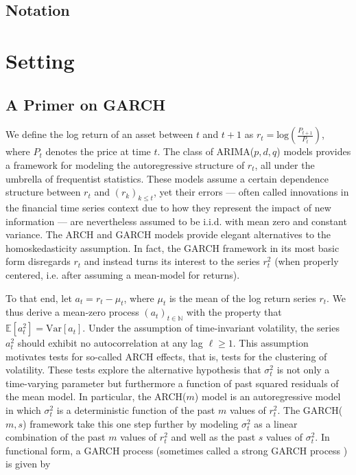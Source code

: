 \documentclass[11pt,3p,review,authoryear]{elsarticle}
\def\mrm#1{\mathrm{#1}} %
\def\E{\mathbb{E}} %
\theoremstyle{definition}
\begin{document}
\subsection{Notation}

\section{Setting}
\label{section2}

\subsection{A Primer on GARCH}
We define the log return of an asset between $t$ and $t+1$ as $r_{t} = \text{log}(\frac{P_{t+1}}{P_{t}})$, where $P_{t}$ denotes the price at time $t$.  The class of ARIMA($p,d,q$) models  \citep{box2013box} provides a framework for modeling the autoregressive structure of $r_{t}$, all under the umbrella of frequentist statistics.  These models assume a certain dependence structure between $r_{t}$ and $(r_{k})_{k\leq t}$, yet their errors --- often called innovations in the financial time series context due to how they represent the impact of new information --- are nevertheless assumed to be i.i.d. with mean zero and constant variance.  The ARCH \citep{engle1982autoregressive} and GARCH \citep{bollerslev1986generalized} models provide elegant alternatives to the homoskedasticity assumption.  In fact, the GARCH framework in its most basic form disregards $r_{t}$ and instead turns its interest to the series $r_{t}^{2}$ (when properly centered, i.e. after assuming a mean-model for returns).  

To that end, let $a_{t} = r_{t} - \mu_{t}$, where $\mu_{t}$ is the mean of the log return series $r_{t}$.  We thus derive a mean-zero process $(a_{t})_{t\in\mathbb{N}}$ with the property that $\E[a^{2}_{t}] = \mrm{Var}[a_{t}]$.  Under the assumption of time-invariant volatility, the series $a_{t}^{2}$ should exhibit no autocorrelation at any lag $\ell\geq1$.  This assumption motivates tests for so-called ARCH effects, that is, tests for the clustering of volatility.  These tests explore the alternative hypothesis that $\sigma_{t}^{2}$ is not only a time-varying parameter but furthermore a function of past squared residuals of the mean model.  In particular, the ARCH($m$) model is an autoregressive model in which $\sigma_{t}^{2}$ is a deterministic function of the past $m$ values of $r_{t}^{2}$.  The GARCH($m,s$) framework take this one step further by modeling $\sigma_{t}^{2}$ as a linear combination of the past $m$ values of $r_{t}^{2}$ and well as the past $s$ values of $\sigma_{t}^{2}$.  In functional form, a GARCH process (sometimes called a strong GARCH process \citep[p. 19]{francq2019garch}) is given by
\end{document}
